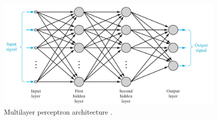 \begin{figure}[!htb]
\centering
\includegraphics[width=.80\columnwidth]{images/111multilayerperceptron}
\caption[Multilayer perceptron]{Multilayer perceptron architecture
\cite{RefWorks:158}.}
\label{fig:111multilayerperceptron}
\end{figure}